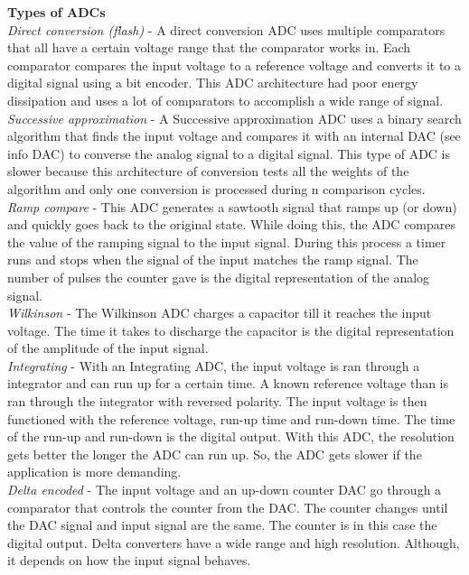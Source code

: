 \textbf{Types of ADCs}\\
        \textit{Direct conversion (flash)} - A direct conversion ADC uses multiple comparators that all have a certain voltage range that the comparator works in. Each comparator compares the input voltage to a reference voltage and converts it to a digital signal using a bit encoder. 
        This ADC architecture had poor energy dissipation and uses a lot of comparators to accomplish a wide range of signal.\\

        \textit{Successive approximation} - A Successive approximation ADC uses a binary search algorithm that finds the input voltage and compares it with an internal DAC (see info DAC) to converse the analog signal to a digital signal. This type of ADC is slower because this architecture of conversion tests all the weights of the algorithm and only one conversion is processed during n comparison cycles. \\

        \textit{Ramp compare} - This ADC generates a sawtooth signal that ramps up (or down) and quickly goes back to the original state. While doing this, the ADC compares the value of the ramping signal to the input signal. During this process a timer runs and stops when the signal of the input matches the ramp signal. The number of pulses the counter gave is the digital representation of the analog signal.\\

        \textit{Wilkinson} - The Wilkinson ADC charges a capacitor till it reaches the input voltage. The time it takes to discharge the capacitor is the digital representation of the amplitude of the input signal. \\

        \textit{Integrating} - With an Integrating ADC, the input voltage is ran through a integrator and can run up for a certain time. A known reference voltage than is ran through the integrator with reversed polarity. The input voltage is then functioned with the reference voltage, run-up time and run-down time. The time of the run-up and run-down is the digital output. 
        With this ADC, the resolution gets better the longer the ADC can run up. So, the ADC gets slower if the application is more demanding. \\

        \textit{Delta encoded} - The input voltage and an up-down counter DAC go through a comparator that controls the counter from the DAC. The counter changes until the DAC signal and input signal are the same. The counter is in this case the digital output.
        Delta converters have a wide range and high resolution. Although, it depends on how the input signal behaves.\\
        
